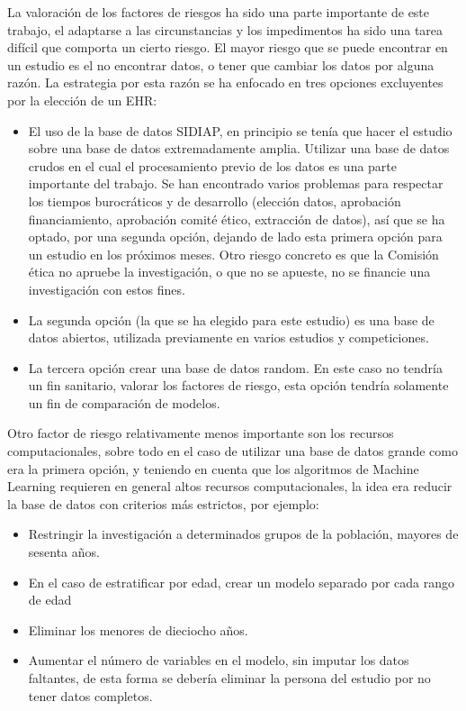 \documentclass[
]{article}
\begin{document}
La valoración de los factores de riesgos ha sido una parte importante de
este trabajo, el adaptarse a las circunstancias y los impedimentos ha
sido una tarea difícil que comporta un cierto riesgo. El mayor riesgo
que se puede encontrar en un estudio es el no encontrar datos, o tener
que cambiar los datos por alguna razón. La estrategia por esta razón se
ha enfocado en tres opciones excluyentes por la elección de un EHR:

\begin{itemize}
\item
  El uso de la base de datos SIDIAP, en principio se tenía que hacer el
  estudio sobre una base de datos extremadamente amplia. Utilizar una
  base de datos crudos en el cual el procesamiento previo de los datos
  es una parte importante del trabajo. Se han encontrado varios
  problemas para respectar los tiempos burocráticos y de desarrollo
  (elección datos, aprobación financiamiento, aprobación comité ético,
  extracción de datos), así que se ha optado, por una segunda opción,
  dejando de lado esta primera opción para un estudio en los próximos
  meses. Otro riesgo concreto es que la Comisión ética no apruebe la
  investigación, o que no se apueste, no se financie una investigación
  con estos fines.
\item
  La segunda opción (la que se ha elegido para este estudio) es una base
  de datos abiertos, utilizada previamente en varios estudios y
  competiciones.
\item
  La tercera opción crear una base de datos random. En este caso no
  tendría un fin sanitario, valorar los factores de riesgo, esta opción
  tendría solamente un fin de comparación de modelos.
\end{itemize}

Otro factor de riesgo relativamente menos importante son los recursos
computacionales, sobre todo en el caso de utilizar una base de datos
grande como era la primera opción, y teniendo en cuenta que los
algoritmos de Machine Learning requieren en general altos recursos
computacionales, la idea era reducir la base de datos con criterios más
estrictos, por ejemplo:

\begin{itemize}
\item
  Restringir la investigación a determinados grupos de la población,
  mayores de sesenta años.
\item
  En el caso de estratificar por edad, crear un modelo separado por cada
  rango de edad
\item
  Eliminar los menores de dieciocho años.
\item
  Aumentar el número de variables en el modelo, sin imputar los datos
  faltantes, de esta forma se debería eliminar la persona del estudio
  por no tener datos completos.
\end{itemize}
\end{document}
